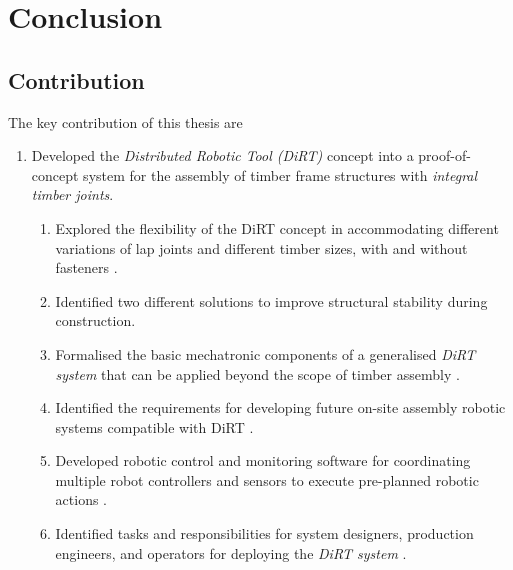 \chapter{Conclusion}
\label{chapter:conclusion}

\section{Contribution}
\label{section:contribution}

The key contribution of this thesis are

\begin{enumerate}
	\item Developed the \textit{Distributed Robotic Tool (DiRT)} concept into a proof-of-concept system for the assembly of timber frame structures with \textit{integral timber joints}. 
	\begin{enumerate}
		\item Explored the flexibility of the DiRT concept in accommodating different variations of lap joints and different timber sizes, with and without fasteners .

		\item Identified two different solutions to improve structural stability during construction. 

		\item Formalised the basic mechatronic components of a generalised \textit{DiRT system} that can be applied beyond the scope of timber assembly .

		\item Identified the requirements for developing future on-site assembly robotic systems compatible with DiRT .

		\item Developed robotic control and monitoring software for coordinating multiple robot controllers and sensors to execute pre-planned robotic actions .

		\item Identified tasks and responsibilities for system designers, production engineers, and operators for deploying the \textit{DiRT system} .


\end{enumerate}
\end{enumerate}
